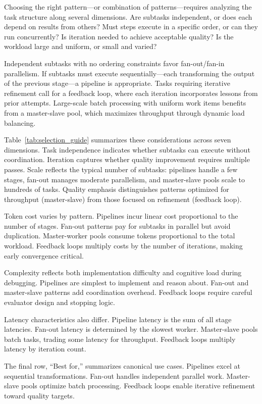 Choosing the right pattern---or combination of patterns---requires analyzing the task structure along several dimensions.
Are subtasks independent, or does each depend on results from others?
Must steps execute in a specific order, or can they run concurrently?
Is iteration needed to achieve acceptable quality?
Is the workload large and uniform, or small and varied?

Independent subtasks with no ordering constraints favor fan-out/fan-in parallelism.
If subtasks must execute sequentially---each transforming the output of the previous stage---a pipeline is appropriate.
Tasks requiring iterative refinement call for a feedback loop, where each iteration incorporates lessons from prior attempts.
Large-scale batch processing with uniform work items benefits from a master-slave pool, which maximizes throughput through dynamic load balancing.

Table~\ref{tab:selection_guide} summarizes these considerations across seven dimensions.
Task independence indicates whether subtasks can execute without coordination.
Iteration captures whether quality improvement requires multiple passes.
Scale reflects the typical number of subtasks: pipelines handle a few stages, fan-out manages moderate parallelism, and master-slave pools scale to hundreds of tasks.
Quality emphasis distinguishes patterns optimized for throughput (master-slave) from those focused on refinement (feedback loop).

Token cost varies by pattern.
Pipelines incur linear cost proportional to the number of stages.
Fan-out patterns pay for subtasks in parallel but avoid duplication.
Master-worker pools consume tokens proportional to the total workload.
Feedback loops multiply costs by the number of iterations, making early convergence critical.

Complexity reflects both implementation difficulty and cognitive load during debugging.
Pipelines are simplest to implement and reason about.
Fan-out and master-slave patterns add coordination overhead.
Feedback loops require careful evaluator design and stopping logic.

Latency characteristics also differ.
Pipeline latency is the sum of all stage latencies.
Fan-out latency is determined by the slowest worker.
Master-slave pools batch tasks, trading some latency for throughput.
Feedback loops multiply latency by iteration count.

The final row, ``Best for,'' summarizes canonical use cases.
Pipelines excel at sequential transformations.
Fan-out handles independent parallel work.
Master-slave pools optimize batch processing.
Feedback loops enable iterative refinement toward quality targets.

